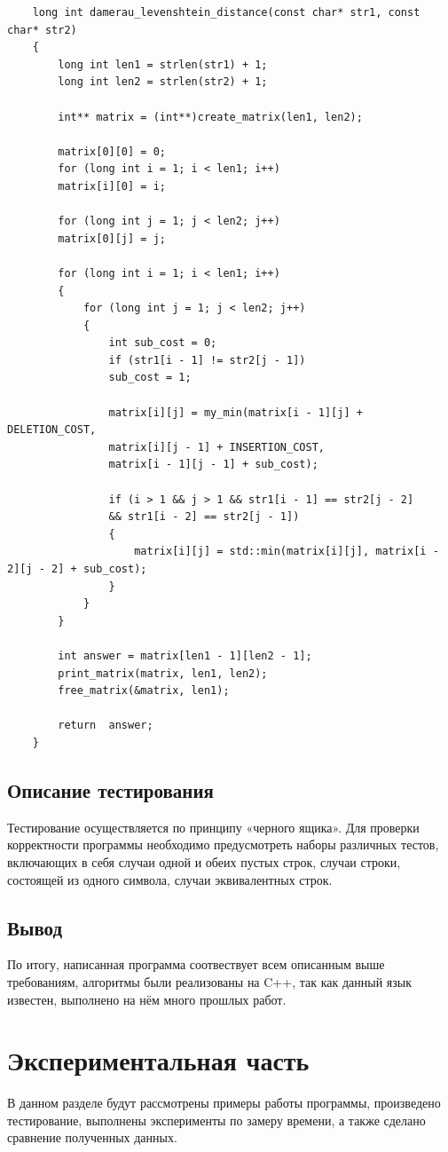 \documentclass[12pt]{report}
\begin{document}
\begin{lstlisting}
	long int damerau_levenshtein_distance(const char* str1, const char* str2)
	{
		long int len1 = strlen(str1) + 1;
		long int len2 = strlen(str2) + 1;

		int** matrix = (int**)create_matrix(len1, len2);
		
		matrix[0][0] = 0;
		for (long int i = 1; i < len1; i++)
		matrix[i][0] = i;
		
		for (long int j = 1; j < len2; j++)
		matrix[0][j] = j;
		
		for (long int i = 1; i < len1; i++)
		{
			for (long int j = 1; j < len2; j++)
			{
				int sub_cost = 0;
				if (str1[i - 1] != str2[j - 1])
				sub_cost = 1;
				
				matrix[i][j] = my_min(matrix[i - 1][j] + DELETION_COST,
				matrix[i][j - 1] + INSERTION_COST,
				matrix[i - 1][j - 1] + sub_cost);
				
				if (i > 1 && j > 1 && str1[i - 1] == str2[j - 2]
				&& str1[i - 2] == str2[j - 1])
				{
					matrix[i][j] = std::min(matrix[i][j], matrix[i - 2][j - 2] + sub_cost);
				}
			}
		}
		
		int answer = matrix[len1 - 1][len2 - 1];
		print_matrix(matrix, len1, len2);		
		free_matrix(&matrix, len1);
		
		return  answer;
	}
\end{lstlisting}

\section{Описание тестирования}
Тестирование осуществляется по принципу «черного ящика».
Для проверки корректности программы необходимо предусмотреть наборы различных тестов,
включающих в себя случаи одной и обеих пустых строк, случаи строки, состоящей из одного
символа, случаи эквивалентных строк.

\section*{Вывод}
По итогу, написанная программа соотвествует всем описанным выше требованиям, алгоритмы были реализованы на C++, так как данный язык известен, выполнено на нём много прошлых работ. 

\chapter{Экспериментальная часть}
В данном разделе будут рассмотрены примеры работы программы, произведено тестирование,
выполнены эксперименты по замеру времени, а также сделано сравнение полученных данных.
\end{document}

